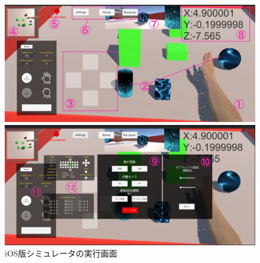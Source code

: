 \documentclass{ltjsreport}
\begin{document}
		\begin{figure}[H]
		\centering
		\begin{minipage}{0.7\columnwidth}
		\centering
		\includegraphics[width = \columnwidth]{../figs/IMG_0344.JPG}
		\end{minipage}
		\hspace{0.04\columnwidth}
		\begin{minipage}{0.7\columnwidth}
		\centering
		\includegraphics[width = \columnwidth]{../figs/IMG_0343.JPG}
		\end{minipage}
		\caption{iOS版シミュレータの実行画面}
		\label{fig:iOSsimulate}
		\end{figure}
		\vspace{-15pt}
\end{document}
